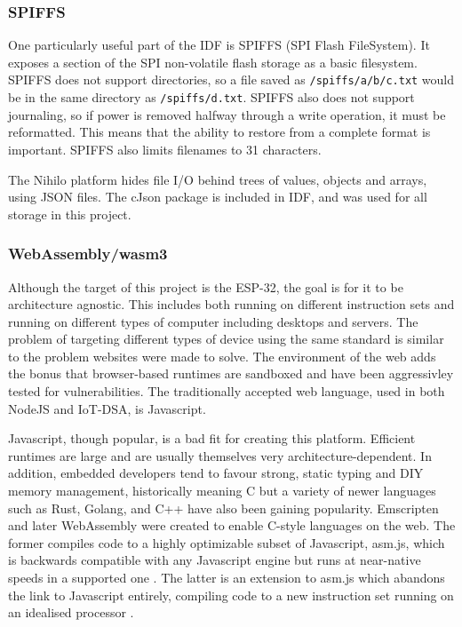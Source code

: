 \documentclass{article}
\begin{document}
\subsubsection{SPIFFS}

One particularly useful part of the IDF is SPIFFS (SPI Flash FileSystem).
It exposes a section of the SPI non-volatile flash storage as a basic filesystem.
SPIFFS does not support directories, so a file saved as \texttt{/spiffs/a/b/c.txt} would be in the same directory as \texttt{/spiffs/d.txt}.
SPIFFS also does not support journaling, so if power is removed halfway through a write operation, it must be reformatted.
This means that the ability to restore from a complete format is important.
SPIFFS also limits filenames to 31 characters.

The Nihilo platform hides file I/O behind trees of values, objects and arrays, using JSON files.
The cJson package is included in IDF, and was used for all storage in this project.

\subsubsection{WebAssembly/wasm3}

Although the target of this project is the ESP-32, the goal is for it to be architecture agnostic.
This includes both running on different instruction sets and running on different types of computer including desktops and servers.
The problem of targeting different types of device using the same standard is similar to the problem websites were made to solve.
The environment of the web adds the bonus that browser-based runtimes are sandboxed and have been aggressivley tested for vulnerabilities.
The traditionally accepted web language, used in both NodeJS and IoT-DSA, is Javascript.

Javascript, though popular, is a bad fit for creating this platform.
Efficient runtimes are large and are usually themselves very architecture-dependent.
In addition, embedded developers tend to favour strong, static typing and DIY memory management, historically meaning C but a variety of newer languages such as Rust, Golang, and C++ have also been gaining popularity.
Emscripten and later WebAssembly were created to enable C-style languages on the web.
The former compiles code to a highly optimizable subset of Javascript, asm.js, which is backwards compatible with any Javascript engine but runs at near-native speeds in a supported one \cite{asm}.
The latter is an extension to asm.js which abandons the link to Javascript entirely, compiling code to a new instruction set running on an idealised processor \cite{wasm}.
\end{document}
